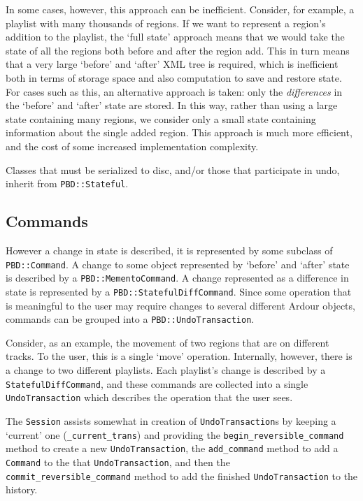 \documentclass[10pt,a4paper]{book}
\newcommand{\code}[1]{\texttt{#1}}
\begin{document}
In some cases, however, this approach can be inefficient.  Consider,
for example, a playlist with many thousands of regions.  If we want to
represent a region's addition to the playlist, the `full state'
approach means that we would take the state of all the regions both
before and after the region add.  This in turn means that a very large
`before' and `after' XML tree is required, which is inefficient both
in terms of storage space and also computation to save and restore
state.  For cases such as this, an alternative approach is taken: only
the \emph{differences} in the `before' and `after' state are stored.
In this way, rather than using a large state containing many regions,
we consider only a small state containing information about the single
added region.  This approach is much more efficient, and the cost of
some increased implementation complexity.

Classes that must be serialized to disc, and/or those that participate
in undo, inherit from \code{PBD::Stateful}.

\subsection{Commands}

However a change in state is described, it is represented by some
subclass of \code{PBD::Command}.  A change to some object represented
by `before' and `after' state is described by a
\code{PBD::MementoCommand}.  A change represented as a difference in
state is represented by a \code{PBD::StatefulDiffCommand}.  Since some
operation that is meaningful to the user may require changes to
several different Ardour objects, commands can be grouped into a
\code{PBD::UndoTransaction}.

Consider, as an example, the movement of two regions that are on
different tracks.  To the user, this is a single `move' operation.
Internally, however, there is a change to two different playlists.
Each playlist's change is described by a \code{StatefulDiffCommand},
and these commands are collected into a single \code{UndoTransaction}
which describes the operation that the user sees.

The \code{Session} assists somewhat in creation of
\code{UndoTransaction}s by keeping a `current' one
(\code{\_current\_trans}) and providing the
\code{begin\_reversible\_command} method to create a new
\code{UndoTransaction}, the \code{add\_command} method to add a
\code{Command} to the that \code{UndoTransaction}, and then the
\code{commit\_reversible\_command} method to add the finished
\code{UndoTransaction} to the history.
\end{document}
